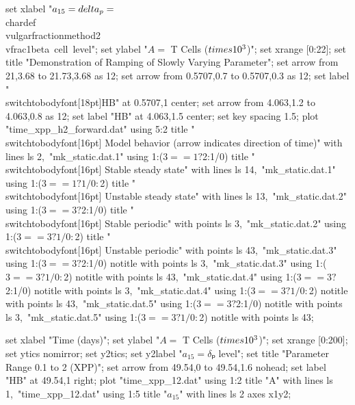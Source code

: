   set xlabel "$a_{15} = \\delta_p = $\\chardef\\vulgarfractionmethod2\\vfrac1{beta~cell~level}";
  set ylabel "$A = $ T Cells ($\\times 10^3$)";
  set xrange [0:22];
  set title "Demonstration of Ramping of Slowly Varying Parameter";
  set arrow from 21,3.68 to 21.73,3.68 as 12;
  set arrow from 0.5707,0.7 to 0.5707,0.3 as 12;
  set label "\\switchtobodyfont[18pt]HB" at 0.5707,1 center;
  set arrow from 4.063,1.2 to 4.063,0.8 as 12;
  set label "HB" at 4.063,1.5 center;
  set key spacing 1.5;
  plot "time_xpp_h2_forward.dat" using 5:2 title "\\switchtobodyfont[16pt] Model behavior (arrow indicates direction of time)" with lines ls 2,\
       "mk_static.dat.1" using 1:($3==1?$2:1/0) title "\\switchtobodyfont[16pt] Stable steady state" with lines ls 14,\
       "mk_static.dat.1" using 1:($3==1?1/0:$2) title "\\switchtobodyfont[16pt] Unstable steady state" with lines ls 13,\
       "mk_static.dat.2" using 1:($3==3?$2:1/0) title "\\switchtobodyfont[16pt] Stable periodic" with points ls 3,\
       "mk_static.dat.2" using 1:($3==3?1/0:$2) title "\\switchtobodyfont[16pt] Unstable periodic" with points ls 43,\
       "mk_static.dat.3" using 1:($3==3?$2:1/0) notitle with points ls 3,\
       "mk_static.dat.3" using 1:($3==3?1/0:$2) notitle with points ls 43,\
       "mk_static.dat.4" using 1:($3==3?$2:1/0) notitle with points ls 3,\
       "mk_static.dat.4" using 1:($3==3?1/0:$2) notitle with points ls 43,\
       "mk_static.dat.5" using 1:($3==3?$2:1/0) notitle with points ls 3,\
       "mk_static.dat.5" using 1:($3==3?1/0:$2) notitle with points ls 43;
\stopGNUPLOTscript

\startGNUPLOTscript[time_xpp_12]
  set xlabel "Time (days)";
  set ylabel "$A = $ T Cells ($\\times 10^3$)";
  set xrange [0:200];
  set ytics nomirror;
  set y2tics;
  set y2label "$a_{15} = δₚ$ level";
  set title "Parameter Range 0.1 to 2 (XPP)";
  set arrow from 49.54,0 to 49.54,1.6 nohead;
  set label "HB" at 49.54,1 right;
  plot "time_xpp_12.dat" using 1:2 title "A" with lines ls 1,\
       "time_xpp_12.dat" using 1:5 title "$a_{15}$" with lines ls 2 axes x1y2;
\stopGNUPLOTscript

